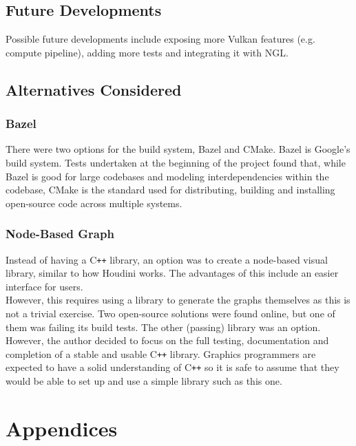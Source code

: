 \documentclass[12pt]{report}
\newcommand{\cpp}{C\texttt{++}}
\theoremstyle{definition}
\begin{document}
  \section{Future Developments}
    
    Possible future developments include exposing more Vulkan features
    (e.g. compute pipeline), adding more tests and integrating it with
    NGL.

  \section{Alternatives Considered}

    \subsection{Bazel}

      There were two options for the build system, Bazel and CMake. Bazel is
      Google's build system. Tests undertaken at the beginning of the
      project found that, while Bazel is good for large codebases and
      modeling interdependencies within the codebase, CMake is the
      standard used for distributing, building and installing
      open-source code across multiple systems.

    \subsection{Node-Based Graph}

      Instead of having a \cpp{} library, an option was to create a node-based visual
      library, similar to how Houdini works. The advantages of this include an
      easier interface for users. \\

      However, this requires using a library to generate the graphs themselves
      as this is not a trivial exercise. Two open-source solutions were
      found online, but one of them was failing its build tests. The
      other (passing) library was an option. However, the author
      decided to focus on the full testing, documentation and
      completion of a stable and usable \cpp{} library. Graphics
      programmers are expected to have a solid understanding
      of \cpp{} so it is safe to assume that they would be able
      to set up and use a simple library such as this one.

  
  

  \chapter*{Appendices}
\end{document}
